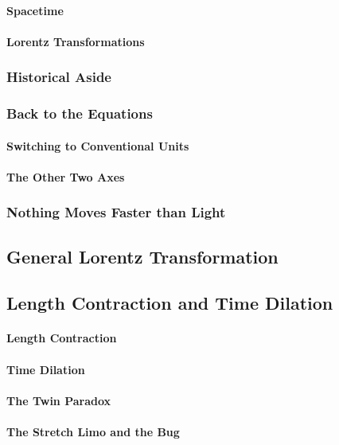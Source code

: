 \documentclass[a4paper]{article}
\begin{document}
\paragraph{Spacetime}

\paragraph{Lorentz Transformations}
\subsubsection{Historical Aside}
\subsubsection{Back to the Equations}
\paragraph{Switching to Conventional Units}
\paragraph{The Other Two Axes}
\subsubsection{Nothing Moves Faster than Light}
\subsection{General Lorentz Transformation}
\subsection{Length Contraction and Time Dilation}
\paragraph{Length Contraction}
%
\paragraph{Time Dilation}
\paragraph{The Twin Paradox}
%
\paragraph{The Stretch Limo and the Bug}
\end{document}

